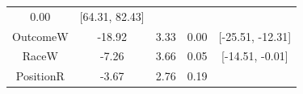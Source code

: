 \documentclass[12pt,twoside]{reedthesis}
\begin{document}
\begin{longtable}[]{@{}ccccc@{}}
\begin{minipage}[t]{0.15\columnwidth}
0.00\strut
\end{minipage} & \begin{minipage}[t]{0.17\columnwidth}\centering\strut
{[}64.31, 82.43{]}\strut
\end{minipage}\tabularnewline
\begin{minipage}[t]{0.25\columnwidth}\centering\strut
OutcomeW\strut
\end{minipage} & \begin{minipage}[t]{0.15\columnwidth}\centering\strut
-18.92\strut
\end{minipage} & \begin{minipage}[t]{0.15\columnwidth}\centering\strut
3.33\strut
\end{minipage} & \begin{minipage}[t]{0.15\columnwidth}\centering\strut
0.00\strut
\end{minipage} & \begin{minipage}[t]{0.17\columnwidth}\centering\strut
{[}-25.51, -12.31{]}\strut
\end{minipage}\tabularnewline
\begin{minipage}[t]{0.25\columnwidth}\centering\strut
RaceW\strut
\end{minipage} & \begin{minipage}[t]{0.15\columnwidth}\centering\strut
-7.26\strut
\end{minipage} & \begin{minipage}[t]{0.15\columnwidth}\centering\strut
3.66\strut
\end{minipage} & \begin{minipage}[t]{0.15\columnwidth}\centering\strut
0.05\strut
\end{minipage} & \begin{minipage}[t]{0.17\columnwidth}\centering\strut
{[}-14.51, -0.01{]}\strut
\end{minipage}\tabularnewline
\begin{minipage}[t]{0.25\columnwidth}\centering\strut
PositionR\strut
\end{minipage} & \begin{minipage}[t]{0.15\columnwidth}\centering\strut
-3.67\strut
\end{minipage} & \begin{minipage}[t]{0.15\columnwidth}\centering\strut
2.76\strut
\end{minipage} & \begin{minipage}[t]{0.15\columnwidth}\centering\strut
0.19\strut
\end{minipage} & \begin{minipage}[t]{0.17\columnwidth}\centering\strut

\end{minipage}
\end{longtable}
\end{document}
